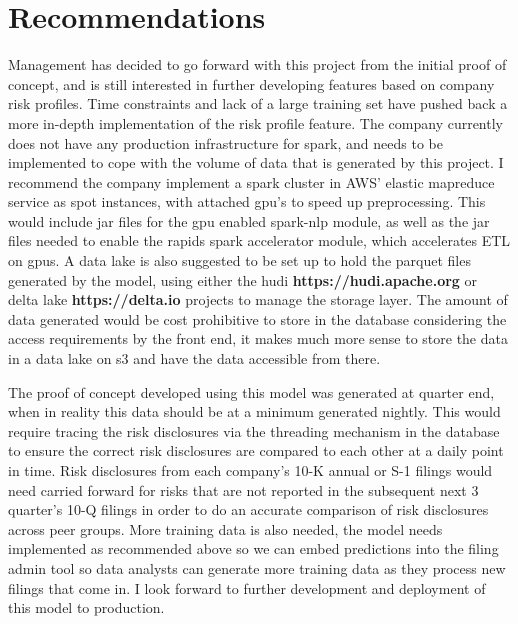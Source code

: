 \documentclass[11pt]{article}
\begin{document}
\pagebreak
     
\section{Recommendations}
Management has decided to go forward with this project from the initial proof of concept, and is still interested in further developing features based on company risk profiles.  Time constraints and lack of a large training set have pushed back a more in-depth implementation of the risk profile feature.  The company currently does not have any production infrastructure for spark, and needs to be implemented to cope with the volume of data that is generated by this project.  I recommend the company implement a spark cluster in AWS' elastic mapreduce service as spot instances, with attached gpu's to speed up preprocessing.  This would include jar files for the gpu enabled spark-nlp module, as well as the jar files needed to enable the rapids spark accelerator module, which accelerates ETL on gpus.  A data lake is also suggested to be set up to hold the parquet files generated by the model, using either the hudi \textbf{https://hudi.apache.org} or delta lake \textbf{https://delta.io} projects to manage the storage layer.  The amount of data generated would be cost prohibitive to store in the database considering the access requirements by the front end, it makes much more sense to store the data in a data lake on s3 and have the data accessible from there. 

\vspace{5 mm}

 The proof of concept developed using this model was generated at quarter end, when in reality this data should be at a minimum generated nightly.  This would require tracing the risk disclosures via the threading mechanism in the database to ensure the correct risk disclosures are compared to each other at a daily point in time.  Risk disclosures from each company's 10-K annual or S-1 filings would need carried forward for risks that are not reported in the subsequent next 3 quarter's 10-Q filings in order to do an accurate comparison of risk disclosures across peer groups.  More training data is also needed, the model needs implemented as recommended above so we can embed predictions into the filing admin tool so data analysts can generate more training data as they process new filings that come in.  I look forward to further development and deployment of this model to production.


\makeatletter
\renewcommand\@biblabel[1]{\textbullet}
\makeatother
\end{document}
